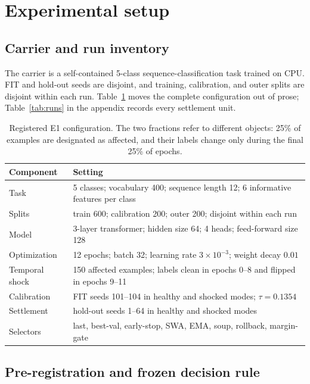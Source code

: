 \documentclass{article} %
\theoremstyle{remark}
\begin{document}
\section{Experimental setup}
\label{sec:exp}

\subsection{Carrier and run inventory}
\label{sec:configuration}

The carrier is a self-contained 5-class sequence-classification task trained on CPU. FIT and
hold-out seeds are disjoint, and training, calibration, and outer splits are disjoint within each
run. Table~\ref{tab:config} moves the complete configuration out of prose; Table~\ref{tab:runs} in
the appendix records every settlement unit.

\begin{table}[t]
\centering
\caption{Registered E1 configuration. The two fractions refer to different objects: 25\% of
examples are designated as affected, and their labels change only during the final 25\% of epochs.}
\label{tab:config}
\small
\begin{tabularx}{\linewidth}{@{}lX@{}}
\toprule
\textbf{Component} & \textbf{Setting} \\
\midrule
Task & 5 classes; vocabulary 400; sequence length 12; 6 informative features per class \\
Splits & train 600; calibration 200; outer 200; disjoint within each run \\
Model & 3-layer transformer; hidden size 64; 4 heads; feed-forward size 128 \\
Optimization & 12 epochs; batch 32; learning rate $3\times10^{-3}$; weight decay $0.01$ \\
Temporal shock & 150 affected examples; labels clean in epochs 0--8 and flipped in epochs 9--11 \\
Calibration & FIT seeds 101--104 in healthy and shocked modes; $\tau=0.1354$ \\
Settlement & hold-out seeds 1--64 in healthy and shocked modes \\
Selectors & last, best-val, early-stop, SWA, EMA, soup, rollback, margin-gate \\
\bottomrule
\end{tabularx}
\end{table}

\subsection{Pre-registration and frozen decision rule}
\label{sec:prereg}
\end{document}
